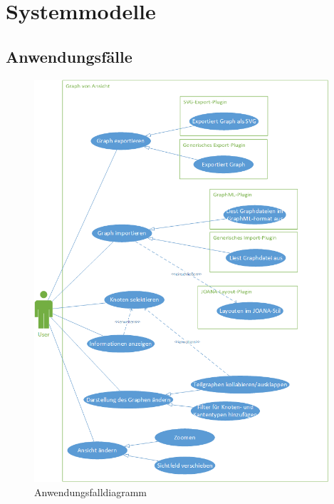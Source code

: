 \chapter{Systemmodelle}
\label{ch:sysmodel}

\section{Anwendungsfälle}
\begin{figure}[ht]
	\centering
	\includegraphics[width=310pt]{resourcen/usecase.png}
	\caption{Anwendungsfalldiagramm}
	\label{fig:usecase}
\end{figure}